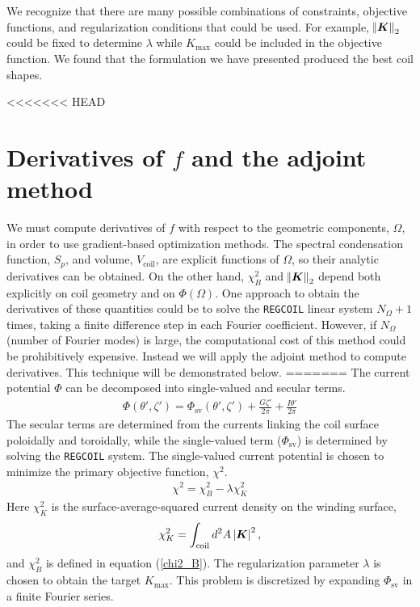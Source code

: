 \documentclass[aps,unsortedaddress]{revtex4-1}
\begin{document}
We recognize that there are many possible combinations of constraints, objective functions, and regularization conditions that could be used. For example, $\norm{\bm{K}}_2$ could be fixed to determine $\lambda$ while $K_{\text{max}}$ could be included in the objective function. We found that the formulation we have presented produced the best coil shapes. 

<<<<<<< HEAD
\section{Derivatives of $f$ and the adjoint method}
\label{sect_adjoint}
We must compute derivatives of $f$ with respect to the geometric components, $\Omega$, in order to use gradient-based optimization methods. The spectral condensation function, $S_p$, and volume, $V_{\text{coil}}$, are explicit functions of $\Omega$, so their analytic derivatives can be obtained. On the other hand, $\chi^2_B$ and $\norm{\bm{K}}_2$ depend both explicitly on coil geometry and on $\Phi(\Omega)$. One approach to obtain the derivatives of these quantities could be to solve the \texttt{REGCOIL} linear system $N_{\Omega} +1$ times, taking a finite difference step in each Fourier coefficient. However, if $N_{\Omega}$ (number of Fourier modes) is large, the computational cost of this method could be prohibitively expensive. Instead we will apply the adjoint method to compute derivatives. This technique will be demonstrated below. 
=======
The current potential $\Phi$ can be decomposed into single-valued and secular terms.
\begin{gather}
\Phi(\theta', \zeta') = \Phi_{\text{sv}}(\theta',\zeta') + \frac{ G \zeta'}{2 \pi} + \frac{I \theta'}{2 \pi}
\end{gather}
The secular terms are determined from the currents linking the coil surface poloidally and toroidally, while the single-valued term ($\Phi_{\text{sv}}$) is determined by solving the \texttt{REGCOIL} system. The single-valued current potential is chosen to minimize the primary objective function, $\chi^2$.
\begin{gather}
\chi^2 = \chi^2_B - \lambda \chi^2_K
\label{primary_objective}
\end{gather}
Here $\chi^2_K$ is the surface-average-squared current density on the winding surface,
\begin{gather}
\chi^2_K = \int_{\text{coil}} d^2A \, \abs{\bm{K}}^2,
\end{gather}
and $\chi^2_B$ is defined in equation (\ref{chi2_B}). The regularization parameter $\lambda$ is chosen to obtain the target $K_{\text{max}}$. This problem is discretized by expanding $\Phi_{\text{sv}}$ in a finite Fourier series.
\end{document}
